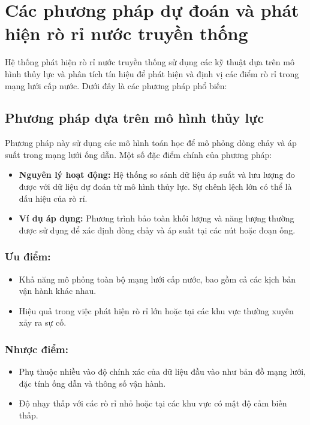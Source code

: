 \section{Các phương pháp dự đoán và phát hiện rò rỉ nước truyền thống}

Hệ thống phát hiện rò rỉ nước truyền thống sử dụng các kỹ thuật dựa trên mô hình thủy lực và phân tích tín hiệu để phát hiện và định vị các điểm rò rỉ trong mạng lưới cấp nước. Dưới đây là các phương pháp phổ biến:

\subsection{Phương pháp dựa trên mô hình thủy lực}
Phương pháp này\cite{Hydraulic_Modeling} sử dụng các mô hình toán học để mô phỏng dòng chảy và áp suất trong mạng lưới ống dẫn. Một số đặc điểm chính của phương pháp:
\begin{itemize}
    \item \textbf{Nguyên lý hoạt động:} Hệ thống so sánh dữ liệu áp suất và lưu lượng đo được với dữ liệu dự đoán từ mô hình thủy lực. Sự chênh lệch lớn có thể là dấu hiệu của rò rỉ.
    \item \textbf{Ví dụ áp dụng:} Phương trình bảo toàn khối lượng và năng lượng thường được sử dụng để xác định dòng chảy và áp suất tại các nút hoặc đoạn ống.
\end{itemize}

\subsubsection{Ưu điểm:}
\begin{itemize}
    \item Khả năng mô phỏng toàn bộ mạng lưới cấp nước, bao gồm cả các kịch bản vận hành khác nhau.
    \item Hiệu quả trong việc phát hiện rò rỉ lớn hoặc tại các khu vực thường xuyên xảy ra sự cố.
\end{itemize}

\subsubsection{Nhược điểm:}
\begin{itemize}
    \item Phụ thuộc nhiều vào độ chính xác của dữ liệu đầu vào như bản đồ mạng lưới, đặc tính ống dẫn và thông số vận hành.
    \item Độ nhạy thấp với các rò rỉ nhỏ hoặc tại các khu vực có mật độ cảm biến thấp.
\end{itemize}

